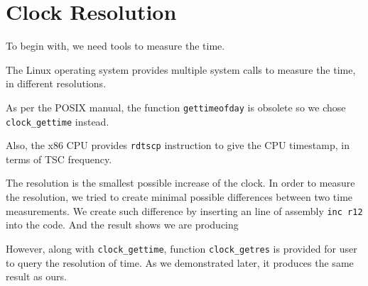\section{Clock Resolution}

To begin with, we need tools to measure the time.

The Linux operating system provides multiple system calls to measure the time, in different resolutions.

As per the POSIX manual\cite{posix_clock_gettime}, the function \texttt{gettimeofday} is obsolete so we chose \texttt{clock\_gettime} instead.

Also, the x86 CPU provides \texttt{rdtscp} instruction to give the CPU timestamp, in terms of TSC frequency.

The resolution is the smallest possible increase of the clock. In order to measure the resolution, we tried to create minimal possible differences between two time measurements. We create such difference by inserting an line of assembly \texttt{inc r12} into the code. And the result shows we are producing

However, along with \texttt{clock\_gettime}, function \texttt{clock\_getres} is provided for user to query the resolution of time. As we demonstrated later, it produces the same result as ours.